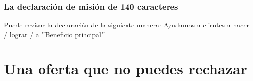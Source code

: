 \documentclass[10pt]{book}
\begin{document}
	    \subsection{La declaración de misión de 140 caracteres}
	    Puede revisar la declaración de la siguiente manera: Ayudamos a clientes a hacer / lograr / a $"$Beneficio principal$"$

    \chapter{Una oferta que no puedes rechazar}
	    
\end{document}
